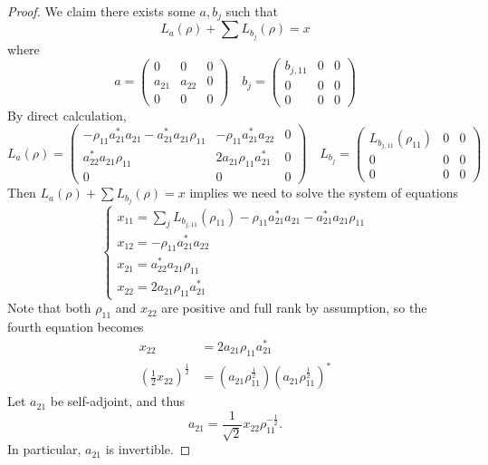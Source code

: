 \documentclass[11pt,reqno]{amsart}
\theoremstyle{definition}
\newcommand{\lpara}{\left(}
\newcommand{\rpara}{\right)}
\begin{document}
\begin{proof}
    We claim there exists some $a, b_j$ such that $$L_a(\rho)+\sum L_{b_j}(\rho)=x$$
    where $$a=\begin{pmatrix}
        0 & 0 & 0\\
        a_{21} & a_{22} & 0\\
        0 & 0 & 0
    \end{pmatrix} \quad b_j=\begin{pmatrix}
        b_{j,11} & 0 & 0\\
        0 & 0 & 0\\
        0 & 0 & 0
    \end{pmatrix}$$
    By direct calculation, 
    $$L_a(\rho)=\begin{pmatrix}
        -\rho_{11}a_{21}^*a_{21}-a_{21}^*a_{21}\rho_{11} & -\rho_{11}a_{21}^*a_{22} & 0\\
        a_{22}^*a_{21}\rho_{11} & 2a_{21}\rho_{11}a_{21}^* & 0\\
        0 & 0 & 0
    \end{pmatrix}\quad L_{b_j}=\begin{pmatrix}
        L_{b_{j,11}}(\rho_{11}) & 0 & 0\\
        0 & 0 & 0\\
        0 & 0 & 0
    \end{pmatrix}$$
    Then $L_a(\rho)+\sum L_{b_j}(\rho)=x$ implies we need to solve the system of equations 
    $$\begin{cases}
        x_{11} = \sum_j L_{b_{j,11}}(\rho_{11}) -\rho_{11}a_{21}^*a_{21}-a_{21}^*a_{21}\rho_{11}\\
        x_{12} = -\rho_{11}a_{21}^*a_{22}\\
        x_{21} = a_{22}^*a_{21}\rho_{11}\\
        x_{22} = 2a_{21}\rho_{11}a_{21}^*
    \end{cases}$$
    Note that both $\rho_{11}$ and $x_{22}$ are positive and full rank by assumption, so the fourth equation becomes
    \begin{equation*}
    \begin{aligned}
        x_{22} &= 2a_{21}\rho_{11}a_{21}^*\\
        \lpara \frac{1}{2}x_{22}\rpara^{\frac{1}{2}} &= (a_{21}\rho_{11}^{\frac{1}{2}})(a_{21}\rho_{11}^{\frac{1}{2}})^*
    \end{aligned}
    \end{equation*}
    Let $a_{21}$ be self-adjoint, and thus 
    $$a_{21}=\frac{1}{\sqrt{2}}x_{22}\rho_{11}^{-\frac{1}{2}}.$$
    In particular, $a_{21}$ is invertible.

\end{proof}
\end{document}
